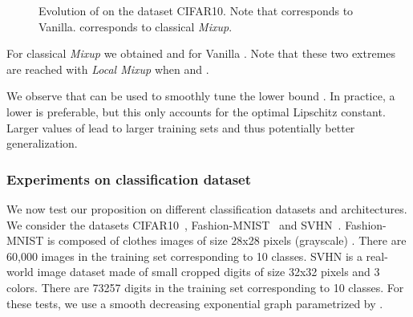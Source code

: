 \documentclass[twoside]{article}
\numberwithin{intassumption}{assumption}
\begin{document}
\begin{figure}[h!]
    \centering
{}
    \caption{Evolution of  on the dataset CIFAR10. Note that  corresponds to Vanilla.  corresponds to classical \emph{Mixup}.}
     \label{fig:evolutionofds}
\end{figure}
For classical \emph{Mixup} we obtained  and for Vanilla . Note that these two extremes are reached with \emph{Local Mixup} when  and  .

We observe that  can be used to smoothly tune the lower bound . In practice, a lower  is preferable, but this only accounts for the optimal Lipschitz constant. Larger values of  lead to larger training sets and thus potentially better generalization.

\subsubsection{Experiments on classification dataset}

We now test our proposition on different classification datasets and architectures.  We consider the datasets CIFAR10~\citep{Cifar10}, Fashion-MNIST~\citep{Fashion} and SVHN~\citep{svhn}. Fashion-MNIST is composed of clothes images of size 28x28 pixels (grayscale) . There are 60,000 images in the training set corresponding to 10 classes. SVHN is a real-world image dataset made of small cropped digits of size 32x32 pixels and 3 colors. There are 73257 digits in the training set corresponding to 10 classes. For these tests, we use a smooth decreasing exponential graph parametrized by .
\end{document}
